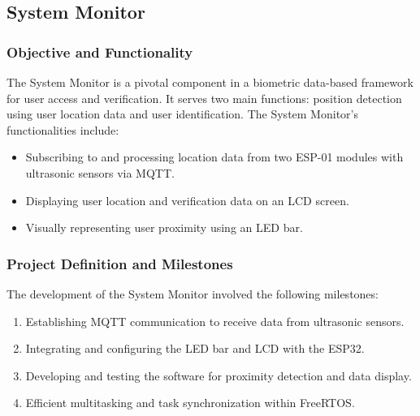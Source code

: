 \subsection{System Monitor}

\subsubsection{Objective and Functionality}
The System Monitor is a pivotal component in a biometric data-based framework for user access and verification. It serves two main functions: position detection using user location data and user identification. The System Monitor's functionalities include:
\begin{itemize}
    \item Subscribing to and processing location data from two ESP-01 modules with ultrasonic sensors via MQTT.
    \item Displaying user location and verification data on an LCD screen.
    \item Visually representing user proximity using an LED bar.
\end{itemize}

\subsubsection{Project Definition and Milestones}
The development of the System Monitor involved the following milestones:
\begin{enumerate}
    \item Establishing MQTT communication to receive data from ultrasonic sensors.
    \item Integrating and configuring the LED bar and LCD with the ESP32.
    \item Developing and testing the software for proximity detection and data display.
    \item Efficient multitasking and task synchronization within FreeRTOS.
\end{enumerate}


